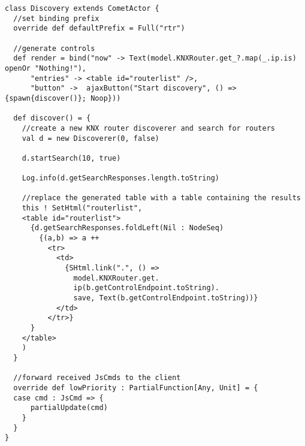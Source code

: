 \begin{lstlisting}[caption=Lift Comet: Discovery.scala,label=lst:lift:cometscala]
class Discovery extends CometActor {
  //set binding prefix
  override def defaultPrefix = Full("rtr")
  
  //generate controls
  def render = bind("now" -> Text(model.KNXRouter.get_?.map(_.ip.is) openOr "Nothing!"),
      "entries" -> <table id="routerlist" />,
      "button" ->  ajaxButton("Start discovery", () => {spawn{discover()}; Noop}))
      
  def discover() = {
    //create a new KNX router discoverer and search for routers
    val d = new Discoverer(0, false)
    
    d.startSearch(10, true)
    
    Log.info(d.getSearchResponses.length.toString)
    
    //replace the generated table with a table containing the results
    this ! SetHtml("routerlist",
    <table id="routerlist">
      {d.getSearchResponses.foldLeft(Nil : NodeSeq)
        {(a,b) => a ++
          <tr>
            <td>
              {SHtml.link(".", () =>
                model.KNXRouter.get.
                ip(b.getControlEndpoint.toString).
                save, Text(b.getControlEndpoint.toString))}
            </td>
          </tr>}
      }
    </table>
    )
  }
  
  //forward received JsCmds to the client
  override def lowPriority : PartialFunction[Any, Unit] = {
  case cmd : JsCmd => {
      partialUpdate(cmd)
    }
  }
}
\end{lstlisting}

